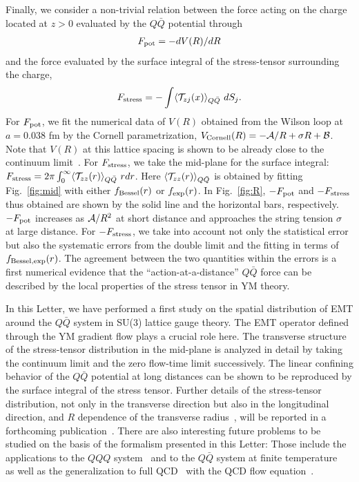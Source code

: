 \documentclass[3p,twocolumn,sort&compress]{elsarticle}
\begin{document}
Finally, we consider a non-trivial relation between the
force acting on the charge located at $z>0$
evaluated by the $Q\bar{Q}$ potential through
\begin{align}
F_{\rm pot}=-dV(R)/dR
\end{align}
and the force 
evaluated by the surface integral of the stress-tensor 
surrounding the charge,
\begin{align}
F_{\rm stress} = - \int  \langle {\cal T}_{zj}(x) \rangle_{Q\bar{Q}}\  dS_j .
\end{align}
For $F_{\rm pot}$,
we fit the numerical data of  $V(R)$ obtained  from the Wilson loop
at $a=0.038$ fm by the Cornell parametrization, $V_{\rm
Cornell}(R)=-{\cal A}/R+\sigma R + {\cal B}$.
Note that $V(R)$ at this lattice spacing
is shown to be already close to the continuum limit~\cite{Bali:2000gf}.
For  $F_{\rm stress}$, we take the mid-plane for  the surface integral:
$F_{\rm stress} = 2 \pi \int_0^{\infty} \langle {\cal T}_{zz}(r)
\rangle_{Q\bar{Q}}  \ r dr $.
Here $\langle {\cal T}_{zz}(r) \rangle_{Q\bar{Q}}$ is obtained by fitting Fig.~\ref{fig:mid}
with either $f_{\rm Bessel}(r)$ or  $f_{\rm exp}(r)$.
In Fig.~\ref{fig:R}, $- F_{\rm pot}$ and $- F_{\rm stress}$
thus obtained are shown by the solid line and the
horizontal bars, respectively.
$-F_{\rm pot}$ increases as ${\cal A}/R^2$ at short distance and approaches
the string tension $\sigma$ at large distance.
For $-F_{\rm stress}$,  we take into account not only the statistical error but
also the systematic errors from the double limit and the fitting in terms of $f_{\rm Bessel,exp}(r)$.
The agreement between the two quantities within the errors
is a first numerical evidence that the ``action-at-a-distance''
$Q\bar{Q}$ force can be described
by the  local properties of the stress tensor in YM theory.

In this Letter, we have performed a first study on the spatial distribution of EMT
around the  $Q\bar{Q}$ system in SU(3) lattice gauge theory. The
EMT operator defined through the YM gradient flow plays a crucial role here.
The transverse structure of the stress-tensor distribution in the mid-plane is analyzed in detail
by taking the continuum limit and the zero flow-time limit successively.
The linear confining behavior of the $Q\bar{Q}$ potential at long distances
can be shown to be reproduced by the surface integral of the stress tensor.
Further details of the stress-tensor  distribution, not only in the
transverse direction but also in the longitudinal direction,
and $R$ dependence of the transverse radius~\cite{Cardoso:2013lla,Luscher:1981,Gliozzi:2010zv},
will
be reported in a forthcoming publication~\cite{Yanagihara:prep}.
There are also  interesting future problems to be studied on the basis
of the formalism presented in this Letter: Those include
the applications to the $QQQ$ system~\cite{Takahashi:2002bw} and to the $Q\bar{Q}$ system
at finite temperature~\cite{Cea:2015wjd} as well as the generalization
to full QCD~\cite{Cea:2017ocq} with the QCD flow equation~\cite{Makino:2014taa,Taniguchi:2016ofw}.
\end{document}
